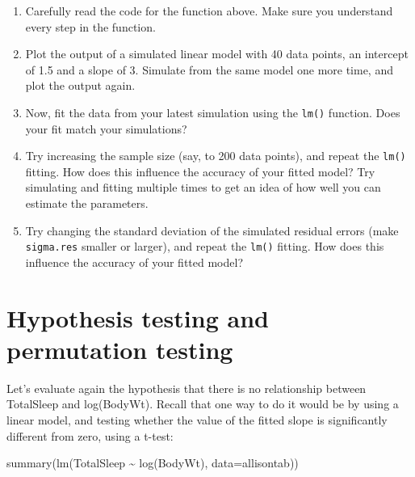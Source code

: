 \documentclass[
]{book}
\newenvironment{Shaded}{\begin{snugshade}}{\end{snugshade}}
\newcommand{\AttributeTok}[1]{\textcolor[rgb]{0.77,0.63,0.00}{#1}}
\newcommand{\FunctionTok}[1]{\textcolor[rgb]{0.00,0.00,0.00}{#1}}
\newcommand{\NormalTok}[1]{#1}
\newcommand{\SpecialCharTok}[1]{\textcolor[rgb]{0.00,0.00,0.00}{#1}}
\providecommand{\tightlist}{%
  \setlength{\itemsep}{0pt}\setlength{\parskip}{0pt}}
\begin{document}
\begin{enumerate}
\def\labelenumi{\alph{enumi})}
\tightlist
\item
  Carefully read the code for the function above. Make sure you understand every step in the function.\\
\item
  Plot the output of a simulated linear model with 40 data points, an intercept of 1.5 and a slope of 3. Simulate from the same model one more time, and plot the output again.\\
\item
  Now, fit the data from your latest simulation using the \texttt{lm()} function. Does your fit match your simulations?\\
\item
  Try increasing the sample size (say, to 200 data points), and repeat the \texttt{lm()} fitting. How does this influence the accuracy of your fitted model? Try simulating and fitting multiple times to get an idea of how well you can estimate the parameters.\\
\item
  Try changing the standard deviation of the simulated residual errors (make \texttt{sigma.res} smaller or larger), and repeat the \texttt{lm()} fitting. How does this influence the accuracy of your fitted model?
\end{enumerate}

\hypertarget{hypothesis-testing-and-permutation-testing}{%
\section{Hypothesis testing and permutation testing}\label{hypothesis-testing-and-permutation-testing}}

Let's evaluate again the hypothesis that there is no relationship between TotalSleep and log(BodyWt). Recall that one way to do it would be by using a linear model, and testing whether the value of the fitted slope is significantly different from zero, using a t-test:

\begin{Shaded}
\begin{Highlighting}[]
\FunctionTok{summary}\NormalTok{(}\FunctionTok{lm}\NormalTok{(TotalSleep }\SpecialCharTok{\textasciitilde{}} \FunctionTok{log}\NormalTok{(BodyWt), }\AttributeTok{data=}\NormalTok{allisontab))}
\end{Highlighting}
\end{Shaded}
\end{document}
